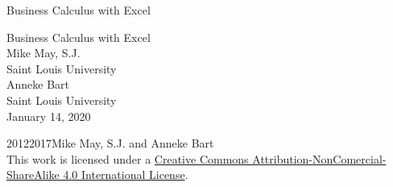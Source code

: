 \documentclass[oneside,10pt,]{book}
\numberwithin{equation}{section}
\begin{document}
\frontmatter
\thispagestyle{empty}
{\centering
\vspace*{0.28\textheight}
{\Huge Business Calculus with Excel}\\}
\clearpage
\thispagestyle{empty}
\null%
\clearpage
\thispagestyle{empty}
{\centering
\vspace*{0.14\textheight}
{\Huge Business Calculus with Excel}\\[3\baselineskip]
{\Large Mike May, S.J.}\\[0.5\baselineskip]
{\Large Saint Louis University}\\[3\baselineskip]
{\Large Anneke Bart}\\[0.5\baselineskip]
{\Large Saint Louis University}\\[3\baselineskip]
{\Large January 14, 2020}\\}
\clearpage
\thispagestyle{empty}
\hypertarget{colophon-1}{}
\noindent\textcopyright{}2012\textendash{}2017\quad{}Mike May, S.J. and Anneke Bart\\[0.5\baselineskip]
 This work is licensed under a \href{http://creativecommons.org/licenses/by-nc-sa/4.0/}{Creative Commons Attribution-NonComercial-ShareAlike 4.0 International License}.\par\medskip
{}
\null\clearpage
%
%
\typeout{************************************************}
\typeout{************************************************}
%
\end{document}
